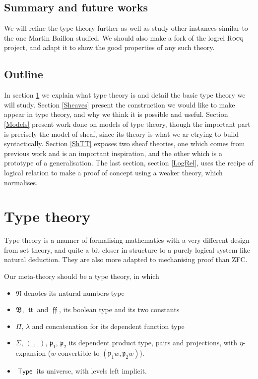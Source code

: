 \documentclass[11pt]{article}
\DeclareMathOperator{\Type}{\mathsf{Type}}
\DeclareMathOperator{\mtrue}{\mathfrak{tt}}
\DeclareMathOperator{\mfalse}{\mathfrak{ff}}
\newcommand{\0}{\mathbf{0}}
\newcommand{\1}{\mathbf{1}}
\newcommand{\mnat}{\mathfrak{N}}
\newcommand{\mbool}{\mathfrak{B}}
\begin{document}
\subsection*{Summary and future works}
We will refine the type theory further as well as study other instances similar to the one Martin Baillon studied.
We should also make a fork of the logrel \textsc{Rocq} project, and adapt it to show the good properties of any such theory.
\newpage
\tableofcontents
\newpage

\subsection*{Outline}

In section \ref{TT} we explain what type theory is and detail the basic type theory we will study. Section \ref{Sheaves} present the construction we would like to make appear in type theory, and why we think it is possible and useful. Section \ref{Models} present work done on models of type theory, though the important part is precisely the model of sheaf, since its theory is what we ar etrying to build syntactically. Section \ref{ShTT} exposes two sheaf theories, one which comes from previous work and is an important inspiration, and the other which is a prototype of a generalisation. The last section, section \ref{LogRel}, uses the recipe of logical relation to make a proof of concept using a weaker theory, which normalises.

\section{Type theory}\label{TT}

Type theory is a manner of formalising mathematics with a very different design from set theory, and quite a bit closer in structure to a purely logical system like natural deduction. They are also more adapted to mechanising proof than ZFC.

Our meta-theory should be a type theory, in which 
\begin{itemize}
    \item $\mnat$ denotes its natural numbers type
    \item $\mbool$, $\mtrue$ and $\mfalse$, its boolean type and its two constants
    \item $\Pi$, $\lambda$ and concatenation for its dependent function type
    \item $\Sigma$, $(\_,\_)$, $\mathfrak{p}_1$, $\mathfrak{p}_2$ its dependent product type, pairs and projections, with $\eta$-expansion ($w$ convertible to $(\mathfrak{p}_1 w, \mathfrak{p}_2 w)$).
    \item $\Type$ its universe, with levels left implicit.
\end{itemize}
\end{document}
